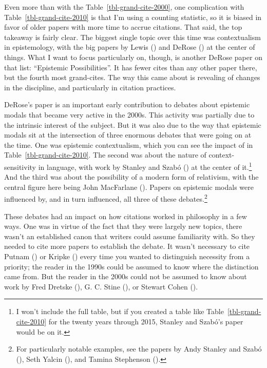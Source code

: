 \documentclass[
  12pt,
  letterpaper,
  DIV=11,
  numbers=noendperiod]{scrartcl}
\begin{document}
Even more than with the Table~\ref{tbl-grand-cite-2000}, one
complication with Table~\ref{tbl-grand-cite-2010} is that I'm using a
counting statistic, so it is biased in favor of older papers with more
time to accrue citations. That said, the top takeaway is fairly clear.
The biggest single topic over this time was contextualism in
epistemology, with the big papers by Lewis
() and DeRose
() at the center of things. What
I want to focus particularly on, though, is another DeRose paper on that
list: ``Epistemic Possibilities''. It has fewer cites than any other
paper there, but the fourth most grand-cites. The way this came about is
revealing of changes in the discipline, and particularly in citation
practices.

DeRose's paper is an important early contribution to debates about
epistemic modals that became very active in the 2000s. This activity was
partially due to the intrinsic interest of the subject. But it was also
due to the way that epistemic modals sit at the intersection of three
enormous debates that were going on at the time. One was epistemic
contextualism, which you can see the impact of in
Table~\ref{tbl-grand-cite-2010}. The second was about the nature of
context-sensitivity in language, with work by Stanley and Szabó
() at the center of
it.\footnote{I won't include the full table, but if you created a table
  like Table~\ref{tbl-grand-cite-2010} for the twenty years through
  2015, Stanley and Szabó's paper would be on it.} And the third was
about the possibility of a modern form of relativism, with the central
figure here being John MacFarlane ().
Papers on epistemic modals were influenced by, and in turn influenced,
all three of these debates.\footnote{For particularly notable examples,
  see the papers by Andy Stanley and Szabó
  (), Seth Yalcin
  (), and Tamina Stephenson
  ().}

These debates had an impact on how citations worked in philosophy in a
few ways. One was in virtue of the fact that they were largely new
topics, there wasn't an established canon that writers could assume
familiarity with. So they needed to cite more papers to establish the
debate. It wasn't necessary to cite Putnam
() or Kripke
() every time you wanted to
distinguish necessity from a priority; the reader in the 1990s could be
assumed to know where the distinction came from. But the reader in the
2000s could not be assumed to know about work by Fred Dretske
(), G. C. Stine
(), or Stewart Cohen
().
\end{document}
